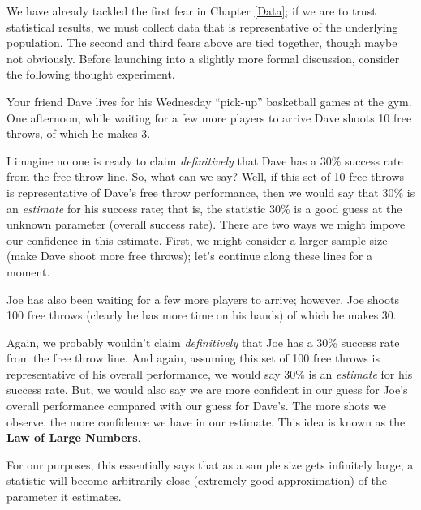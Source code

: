 \documentclass[]{book}
\theoremstyle{plain}
\theoremstyle{mydefn}
\theoremstyle{myexmpl}
\theoremstyle{remark}
\let\BeginKnitrBlock\begin \let\EndKnitrBlock\end
\let\BeginKnitrBlock\begin \let\EndKnitrBlock\end
\begin{document}
We have already tackled the first fear in Chapter \ref{Data}; if we are
to trust statistical results, we must collect data that is
representative of the underlying population. The second and third fears
above are tied together, though maybe not obviously. Before launching
into a slightly more formal discussion, consider the following thought
experiment.

\BeginKnitrBlock{example}[Free Throws]
\protect\hypertarget{exm:samplingdistns-free-throws}{}{\label{exm:samplingdistns-free-throws}
{} }Your friend Dave lives for his Wednesday
``pick-up'' basketball games at the gym. One afternoon, while waiting
for a few more players to arrive Dave shoots 10 free throws, of which he
makes 3.
\EndKnitrBlock{example}

I imagine no one is ready to claim \emph{definitively} that Dave has a
30\% success rate from the free throw line. So, what can we say? Well,
if this set of 10 free throws is representative of Dave's free throw
performance, then we would say that 30\% is an \emph{estimate} for his
success rate; that is, the statistic 30\% is a good guess at the unknown
parameter (overall success rate). There are two ways we might impove our
confidence in this estimate. First, we might consider a larger sample
size (make Dave shoot more free throws); let's continue along these
lines for a moment.

\BeginKnitrBlock{example}[Free Throws (cont.)]
\protect\hypertarget{exm:samplingdistns-free-throws2}{}{\label{exm:samplingdistns-free-throws2}
{} }Joe has also been waiting for a
few more players to arrive; however, Joe shoots 100 free throws (clearly
he has more time on his hands) of which he makes 30.
\EndKnitrBlock{example}

Again, we probably wouldn't claim \emph{definitively} that Joe has a
30\% success rate from the free throw line. And again, assuming this set
of 100 free throws is representative of his overall performance, we
would say 30\% is an \emph{estimate} for his success rate. But, we would
also say we are more confident in our guess for Joe's overall
performance compared with our guess for Dave's. The more shots we
observe, the more confidence we have in our estimate. This idea is known
as the \textbf{Law of Large Numbers}.

\BeginKnitrBlock{definition}[Law of Large Numbers]
\protect\hypertarget{def:defn-lln}{}{\label{def:defn-lln} {} }For our purposes, this essentially says that as a
sample size gets infinitely large, a statistic will become arbitrarily
close (extremely good approximation) of the parameter it estimates.
\EndKnitrBlock{definition}
\end{document}
